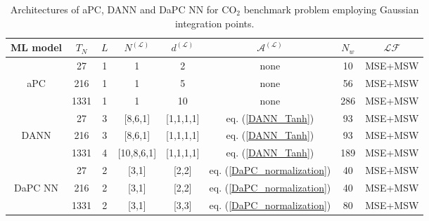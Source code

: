 \documentclass[a4paper,fleqn]{article}
\begin{document}
%
\begin{table}
\caption{Architectures of aPC, DANN and DaPC NN for CO$_2$ benchmark problem employing Gaussian integration points.}
\label{CO2TestCaseG}       
\begin{tabular}{| c | c |c | c | c | c | c | c |}
    \hline
    ML model & $T_N$ & $L$ & $N^{(\mathcal{L})}$ & $d^{(\mathcal{L})}$ & $\mathcal{A}^{(\mathcal{L})}$ & $N_w$ & $\mathcal{LF}$\\
    \hline \hline 
    &27 & 1 & 1 & 2 & none & 10 & MSE+MSW\\
    aPC &216 & 1 & 1 & 5 & none & 56 & MSE+MSW\\
    &1331 & 1 & 1 & 10 & none & 286 & MSE+MSW\\
    \hline
    & 27 & 3 & [8,6,1] & [1,1,1,1] & eq. (\ref{DANN_Tanh}) & 93 & MSE+MSW\\
    DANN & 216 & 3 & [8,6,1] & [1,1,1,1] & eq. (\ref{DANN_Tanh}) & 93 & MSE+MSW\\
    & 1331 & 4 & [10,8,6,1] & [1,1,1,1] & eq. (\ref{DANN_Tanh}) & 189 & MSE+MSW\\
   \hline
    & 27 & 2 & [3,1] & [2,2] & eq. (\ref{DaPC_normalization}) & 40 & MSE+MSW\\
    DaPC NN & 216 & 2 & [3,1] & [2,2] & eq. (\ref{DaPC_normalization}) & 40 & MSE+MSW\\
    & 1331 & 2 & [3,1] & [3,3] & eq. (\ref{DaPC_normalization}) & 80 & MSE+MSW\\
    \hline
\end{tabular}
\end{table}
%
\end{document}
